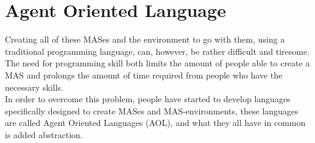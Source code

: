 \chapter{Agent Oriented Language}
Creating all of these MASes and the environment to go with them, using a traditional programming language, can, however, be rather difficult and tiresome. The need for programming skill both limits the amount of people able to create a MAS and prolongs the amount of time required from people who have the necessary skills.\\
\indent In order to overcome this problem, people have started to develop languages specifically designed to create MASes and MAS-environments, these languages are called Agent Oriented Languages (AOL), and what they all have in common is added abstraction. 